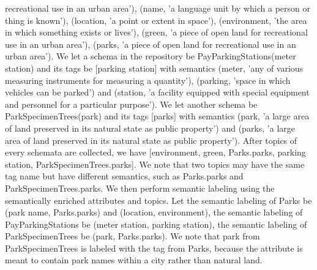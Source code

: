 recreational use in an urban area'), (name, 'a language unit by which a person or thing is known'), (location, 'a point or extent in space'), (environment, 'the area in which something exists or lives'), (green, 'a piece of open land for recreational use in an urban area'), (parks, 'a piece of open land for recreational use in an urban area').
We let a schema in the repository be PayParkingStations(meter station) and its tags be [parking station] with semantics (meter, 'any of various measuring instruments for measuring a quantity'), (parking, 'space in which vehicles can be parked') and (station, 'a facility equipped with special equipment and personnel for a particular purpose'). We let another schema be ParkSpecimenTrees(park) and its tags [parks] with semantics (park, 'a large area of land preserved in its natural state as public property') and (parks, 'a large area of land preserved in its natural state as public property').
After topics of every schemata are collected, we have [environment, green, Parks.parks, parking station, ParkSpecimenTrees.parks]. We note that two topics may have the same tag name but have different semantics, such as Parks.parks and ParkSpecimenTrees.parks. We then perform semantic labeling using the semantically enriched attributes and topics. Let the semantic labeling of Parks be (park name, Parks.parks) and (location, environment), the semantic labeling of PayParkingStations be (meter station, parking station), the semantic labeling of ParkSpecimenTrees be (park, Parks.parks). We note that park from ParkSpecimenTrees is labeled with the tag from Parks, because the attribute is meant to contain park names within a city rather than natural land.

